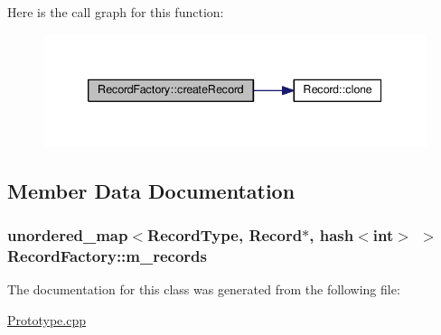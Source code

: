 Here is the call graph for this function\+:
\nopagebreak
\begin{figure}[H]
\begin{center}
\leavevmode
\includegraphics[width=339pt]{classRecordFactory_a0606dd9c40bc58a23f995bf39b4e5444_cgraph}
\end{center}
\end{figure}




\subsection{Member Data Documentation}
\subsubsection[{\texorpdfstring{m\+\_\+records}{m_records}}]{\setlength{\rightskip}{0pt plus 5cm}unordered\+\_\+map$<${\bf Record\+Type}, {\bf Record}$\ast$, hash$<$int$>$ $>$ Record\+Factory\+::m\+\_\+records\hspace{0.3cm}{\ttfamily [private]}}\hypertarget{classRecordFactory_a5a1de3c7661d204f37bfc7f077e873d0}{}\label{classRecordFactory_a5a1de3c7661d204f37bfc7f077e873d0}


The documentation for this class was generated from the following file\+:\begin{DoxyCompactItemize}
\item 
\hyperlink{Prototype_8cpp}{Prototype.\+cpp}\end{DoxyCompactItemize}
